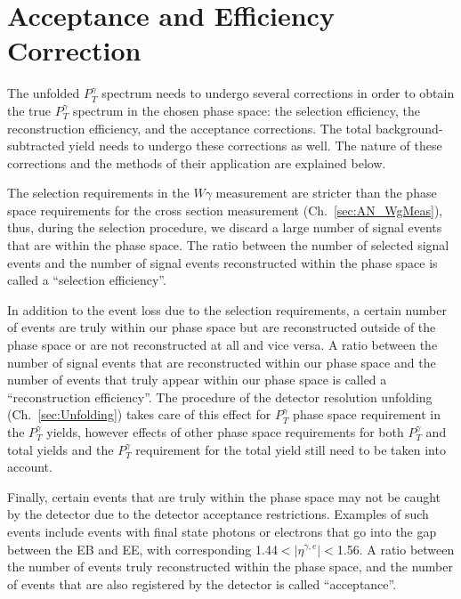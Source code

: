 \section{Acceptance and Efficiency Correction}
\label{sec:AccXEff}


The unfolded $P_T^{\gamma}$ spectrum needs to undergo several corrections in order to obtain the true $P_T^{\gamma}$ spectrum in the chosen phase space: the selection efficiency, the reconstruction efficiency, and the acceptance corrections. The total background-subtracted yield needs to undergo these corrections as well. The nature of these corrections and the methods of their application are explained below.

The selection requirements in the $W\gamma$ measurement are stricter than the phase space requirements for the cross section measurement (Ch.~\ref{sec:AN_WgMeas}), thus, during the selection procedure, we discard a large number of signal events that are within the phase space. The ratio between the number of selected signal events and the number of signal events reconstructed within the phase space is called a ``selection efficiency''. 

In addition to the event loss due to the selection requirements, a certain number of events are truly within our phase space but are reconstructed outside of the phase space or are not reconstructed at all and vice versa. A ratio between the number of signal events that are reconstructed within our phase space and the number of events that truly appear within our phase space is called a ``reconstruction efficiency''. The procedure of the detector resolution unfolding (Ch.~\ref{sec:Unfolding}) takes care of this effect for $P_T^{\gamma}$ phase space requirement in the $P_T^{\gamma}$ yields, however effects of other phase space requirements for both $P_T^{\gamma}$ and total yields and the $P_T^{\gamma}$ requirement for the total yield still need to be taken into account.

Finally, certain events that are truly within the phase space may not be caught by the detector due to the detector acceptance restrictions. Examples of such events include events with final state photons or electrons that go into the gap between the EB and EE, with corresponding 1.44$<|\eta^{\gamma,e}|<$1.56. A ratio between the number of events truly reconstructed within the phase space, and the number of events that are also registered by the detector is called ``acceptance''.  

